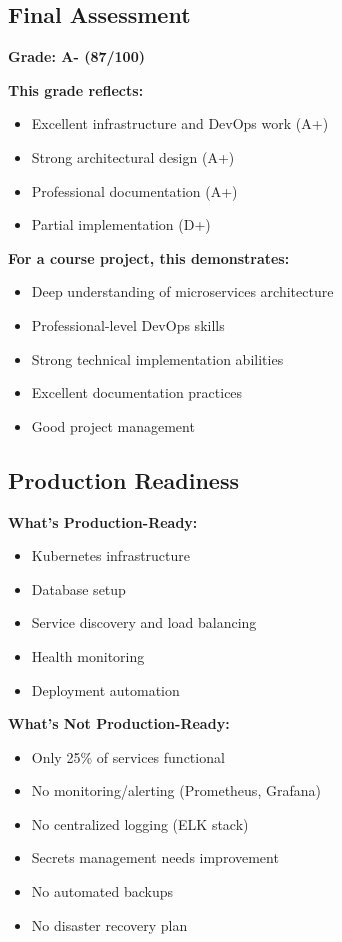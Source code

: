 \documentclass[12pt,a4paper]{article}
\begin{document}
\subsection{Final Assessment}

\textbf{Grade: A- (87/100)}

\textbf{This grade reflects:}
\begin{itemize}
    \item Excellent infrastructure and DevOps work (A+)
    \item Strong architectural design (A+)
    \item Professional documentation (A+)
    \item Partial implementation (D+)
\end{itemize}

\textbf{For a course project, this demonstrates:}
\begin{itemize}
    \item Deep understanding of microservices architecture
    \item Professional-level DevOps skills
    \item Strong technical implementation abilities
    \item Excellent documentation practices
    \item Good project management
\end{itemize}

\subsection{Production Readiness}

\textbf{What's Production-Ready:}
\begin{itemize}
    \item Kubernetes infrastructure
    \item Database setup
    \item Service discovery and load balancing
    \item Health monitoring
    \item Deployment automation
\end{itemize}

\textbf{What's Not Production-Ready:}
\begin{itemize}
    \item Only 25\% of services functional
    \item No monitoring/alerting (Prometheus, Grafana)
    \item No centralized logging (ELK stack)
    \item Secrets management needs improvement
    \item No automated backups
    \item No disaster recovery plan
\end{itemize}
\end{document}
